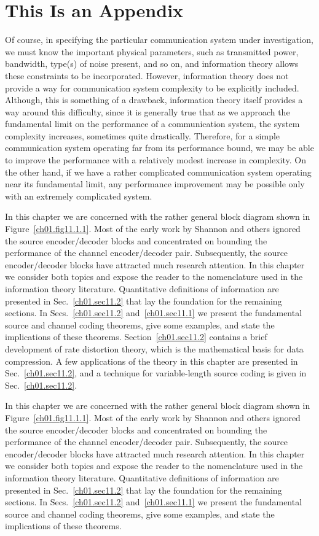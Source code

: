 \appendix

\chapter{This Is an Appendix}

Of course, in specifying the particular communication system under
investigation, we must know the important physical parameters,
such as transmitted
power, bandwidth, type(s) of noise present, and so on,
and information theory allows these constraints to be incorporated.
However, information theory does not provide a way for communication system
complexity to be explicitly included.
Although, this is something of a drawback, information theory itself provides
a way around this difficulty, since it is generally true that as we approach
the fundamental limit on the performance of a communication system,
the system complexity increases, sometimes quite drastically.
Therefore, for a simple communication system operating far
from its performance bound, we may be able to improve the performance
with a relatively modest increase in complexity.
On the other hand, if we have a rather complicated communication system
operating near its fundamental limit, any performance improvement may
be possible only with an extremely complicated system.

In this chapter we are concerned with the rather general block diagram
shown in Figure~\ref{ch01.fig11.1.1}. Most of the early work by
Shannon and others ignored the source  encoder/decoder blocks and
concentrated  on bounding the performance of the channel
encoder/decoder pair. Subsequently, the source  encoder/decoder blocks
have attracted much research attention.  In this chapter we consider
both topics and expose the reader to the nomenclature used in the
information theory literature.
Quantitative definitions of information are presented in
Sec.~\ref{ch01.sec11.2} that lay the foundation for the remaining
sections. In Secs.~\ref{ch01.sec11.2} and~\ref{ch01.sec11.1} we present
the fundamental source and channel coding theorems, give some examples,
and state the implications of these theorems.
Section~\ref{ch01.sec11.2} contains a brief development of rate
distortion theory,
which is the mathematical basis for data compression.
A few applications of the theory in this chapter are presented
in Sec.~\ref{ch01.sec11.2}, and a technique for variable-length
source coding is given in Sec.~\ref{ch01.sec11.2}.

In this chapter we are concerned with the rather general block diagram
shown in Figure~\ref{ch01.fig11.1.1}. Most of the early work by
Shannon and others ignored the source  encoder/decoder blocks and
concentrated  on bounding the performance of the channel
encoder/decoder pair. Subsequently, the source  encoder/decoder blocks
have attracted much research attention.  In this chapter we consider
both topics and expose the reader to the nomenclature used in the
information theory literature.
Quantitative definitions of information are presented in
Sec.~\ref{ch01.sec11.2} that lay the foundation for the remaining
sections. In Secs.~\ref{ch01.sec11.2} and~\ref{ch01.sec11.1} we present
the fundamental source and channel coding theorems, give some examples,
and state the implications of these theorems.


